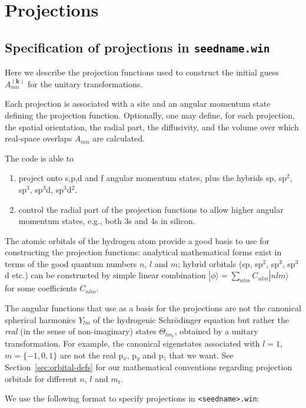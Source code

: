 \chapter{Projections}\label{ch:proj}

\section{Specification of projections in {\tt seedname.win}}
\label{sec:proj}
Here we describe the projection functions used to construct the
initial guess $A_{mn}^{(\mathbf{k})}$ for the unitary transformations.

Each projection is associated with a site and an angular momentum
state defining the projection function. Optionally, one may define,
for each projection, the spatial orientation, the radial part, the
diffusivity, and the volume over which real-space overlaps $A_{mn}$
are calculated.

The code is able to
\begin{enumerate}
\item project onto s,p,d and f
 angular momentum states, plus the hybrids sp, sp$^2$, sp$^3$, sp$^3$d,
 sp$^3$d$^2$.
\item control the radial part of the projection functions
  to allow higher angular momentum states, e.g., both 3s and 4s in
  silicon.
\end{enumerate}

The atomic orbitals of the hydrogen atom provide a good
basis to use for constructing the projection functions: analytical
mathematical forms exist in terms of the good quantum numbers $n$, $l$
and $m$; hybrid orbitals (sp, sp$^{2}$, sp$^{3}$, sp$^{3}$d etc.)
can be constructed by simple linear combination $|\phi\rangle =
\sum_{nlm} C_{nlm}|nlm\rangle$ for some coefficients
$C_{nlm}$.

The angular functions that use as a basis for the
projections are not the canonical spherical harmonics $Y_{lm}$ of the
hydrogenic Schr\"{o}dinger equation but rather the
\textit{real} (in the sense of non-imaginary) states
$\Theta_{lm_{\mathrm{r}}}$, obtained by a unitary
transformation. For example, the canonical
eigenstates associated with $l=1$, $m=\{-1,0,1\}$ are not
the real p$_{x}$, p$_{y}$ and p$_{z}$
that we want. See Section~\ref{sec:orbital-defs} for our mathematical
conventions regarding projection orbitals for different $n$, $l$ and
$m_{\mathrm{r}}$.

We use the following format to specify projections in
\verb#<seedname>.win#:

